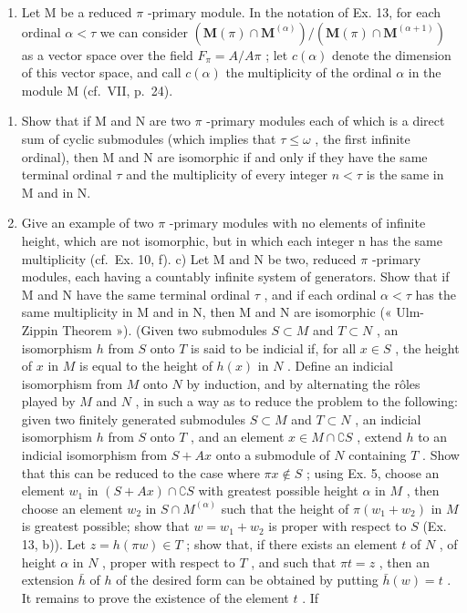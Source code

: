 \begin{enumerate}
\def\labelenumi{\arabic{enumi})}
\setcounter{enumi}{13}
\tightlist
\item
  Let M be a reduced \(\pi\) -primary module. In the notation of Ex. 13, for each ordinal \(\alpha < \tau\) we can consider \((\mathbf{M}(\pi) \cap \mathbf{M}^{(\alpha)}) / (\mathbf{M}(\pi) \cap \mathbf{M}^{(\alpha + 1)})\) as a vector space over the field \(F_{\pi} = A / A\pi\) ; let \(c(\alpha)\) denote the dimension of this vector space, and call \(c(\alpha)\) the multiplicity of the ordinal \(\alpha\) in the module M (cf.~VII, p.~24).
\end{enumerate}

\begin{enumerate}
\def\labelenumi{\alph{enumi})}
\item
  Show that if M and N are two \(\pi\) -primary modules each of which is a direct sum of cyclic submodules (which implies that \(\tau \leqslant \omega\) , the first infinite ordinal), then M and N are isomorphic if and only if they have the same terminal ordinal \(\tau\) and the multiplicity of every integer \(n < \tau\) is the same in M and in N.
\item
  Give an example of two \(\pi\) -primary modules with no elements of infinite height, which are not isomorphic, but in which each integer n has the same multiplicity (cf.~Ex. 10, f). c) Let M and N be two, reduced \(\pi\) -primary modules, each having a countably infinite system of generators. Show that if M and N have the same terminal ordinal \(\tau\) , and if each ordinal \(\alpha < \tau\) has the same multiplicity in M and in N, then M and N are isomorphic (« Ulm-Zippin Theorem »). (Given two submodules \(S \subset M\) and \(T \subset N\) , an isomorphism \(h\) from \(S\) onto \(T\) is said to be indicial if, for all \(x \in S\) , the height of \(x\) in \(M\) is equal to the height of \(h(x)\) in \(N\) . Define an indicial isomorphism from \(M\) onto \(N\) by induction, and by alternating the rôles played by \(M\) and \(N\) , in such a way as to reduce the problem to the following: given two finitely generated submodules \(S \subset M\) and \(T \subset N\) , an indicial isomorphism \(h\) from \(S\) onto \(T\) , and an element \(x \in M \cap \complement S\) , extend \(h\) to an indicial isomorphism from \(S + Ax\) onto a submodule of \(N\) containing \(T\) . Show that this can be reduced to the case where \(\pi x \notin S\) ; using Ex. 5, choose an element \(w_1\) in \((S + Ax) \cap \complement S\) with greatest possible height \(\alpha\) in \(M\) , then choose an element \(w_2\) in \(S \cap M^{(\alpha)}\) such that the height of \(\pi(w_1 + w_2)\) in \(M\) is greatest possible; show that \(w = w_1 + w_2\) is proper with respect to \(S\) (Ex. 13, b)). Let \(z = h(\pi w) \in T\) ; show that, if there exists an element \(t\) of \(N\) , of height \(\alpha\) in \(N\) , proper with respect to \(T\) , and such that \(\pi t = z\) , then an extension \(\bar{h}\) of \(h\) of the desired form can be obtained by putting \(\bar{h}(w) = t\) . It remains to prove the existence of the element \(t\) . If
\end{enumerate}

